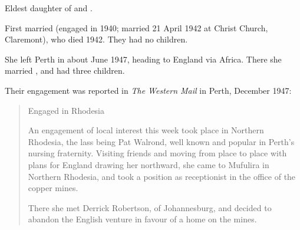 
Eldest daughter of  and .\cite{MartinWalmondMarriage}

First married 
(engaged in 1940\cite{MartinWalmondEngagement}; married 21 April 1942 at Christ Church, Claremont\cite{MartinWalmondMarriage}),
who died 1942.
They had no children.

She left Perth in about June 1947, heading to England via Africa.\cite{PatWalrondWesternMail}
There she married , and had three children.

Their engagement was reported in \emph{The Western Mail} in Perth, December 1947:\cite{PatWalrondWesternMail}
\begin{quotation}
Engaged in Rhodesia

An engagement of local interest this week took place in Northern Rhodesia, the lass being Pat Walrond,
well known and popular in Perth's nursing fraternity.
Visiting friends and moving from place to place with plans for England drawing her northward,
she came to Mufulira in Northern Rhodesia,
and took a position as receptionist in the office of the copper mines.

There she met Derrick Robertson, of Johannesburg, and decided to abandon the English venture in favour of a home on the mines.
\end{quotation}

